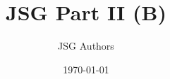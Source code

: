 \documentclass[11pt]{article}
\title{JSG Part II (B)}
\author{JSG Authors}
\date{\today}
\begin{document}
\maketitle

\newcommand{\JSGWrap}{B}















\nocite{*}
\printbibliography
\end{document}
